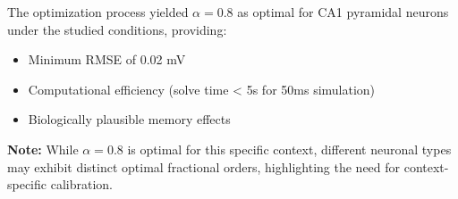 \documentclass[a4paper,12pt]{article}
\begin{document}
The optimization process yielded $\alpha = 0.8$ as optimal for CA1 pyramidal neurons under the studied conditions, providing:
\begin{itemize}[leftmargin=*]
    \item Minimum RMSE of 0.02 mV
    \item Computational efficiency (solve time < 5s for 50ms simulation)
    \item Biologically plausible memory effects
\end{itemize}

\textbf{Note:} While $\alpha = 0.8$ is optimal for this specific context, different neuronal types may exhibit distinct optimal fractional orders, highlighting the need for context-specific calibration.
\end{document}
